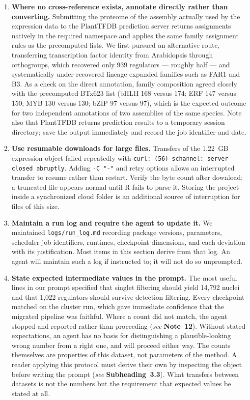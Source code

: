 \documentclass[11pt,a4paper]{article}
\newcommand{\seenote}[1]{(\textit{see} \textbf{Note~#1})}
\newcommand{\seesub}[1]{(\textit{see} \textbf{Subheading~#1})}
\begin{document}
\begin{enumerate}[leftmargin=*]
\item \textbf{Where no cross-reference exists, annotate directly rather than converting.} Submitting the proteome of the assembly actually used by the expression data to the PlantTFDB prediction server returns assignments natively in the required namespace and applies the same family assignment rules as the precomputed lists. We first pursued an alternative route, transferring transcription factor identity from Arabidopsis through orthogroups, which recovered only 939 regulators --- roughly half --- and systematically under-recovered lineage-expanded families such as FAR1 and B3. As a check on the direct annotation, family composition agreed closely with the precomputed BTx623 list (bHLH 168 versus 174; ERF 147 versus 150; MYB 130 versus 130; bZIP 97 versus 97), which is the expected outcome for two independent annotations of two assemblies of the same species. Note also that PlantTFDB returns prediction results to a temporary session directory; save the output immediately and record the job identifier and date.


\item \textbf{Use resumable downloads for large files.} Transfers of the 1.22~GB expression object failed repeatedly with \texttt{curl: (56) schannel: server closed abruptly}. Adding \texttt{-C "-"} and retry options allows an interrupted transfer to resume rather than restart. Verify the byte count after download; a truncated file appears normal until R fails to parse it. Storing the project inside a synchronized cloud folder is an additional source of interruption for files of this size.


\item \textbf{Maintain a run log and require the agent to update it.} We maintained \texttt{logs/run\_log.md} recording package versions, parameters, scheduler job identifiers, runtimes, checkpoint dimensions, and each deviation with its justification. Most items in this section derive from that log. An agent will maintain such a log if instructed to; it will not do so unprompted.

\item \textbf{State expected intermediate values in the prompt.} The most useful lines in our prompt specified that singlet filtering should yield 14,792 nuclei and that 1,022 regulators should survive detection filtering. Every checkpoint matched on the cluster run, which gave immediate confidence that the migrated pipeline was faithful. Where a count did not match, the agent stopped and reported rather than proceeding \seenote{12}. Without stated expectations, an agent has no basis for distinguishing a plausible-looking wrong number from a right one, and will proceed either way. The counts themselves are properties of this dataset, not parameters of the method. A reader applying this protocol must derive their own by inspecting the object before writing the prompt \seesub{3.3}. What transfers between datasets is not the numbers but the requirement that expected values be stated at all.


\end{enumerate}
\end{document}
